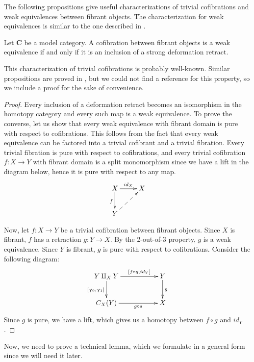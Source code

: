 \documentclass{tac}
\theoremstyle{definition}
\newcommand{\cat}[1]{\mathbf{#1}}
\newcommand{\C}{\cat{C}}
\newcommand{\cyli}{\upgamma}
\begin{document}
The following propositions give useful characterizations of trivial
cofibrations and weak equivalences between fibrant objects.
The characterization for weak equivalences is similar to the one described in \cite{vogt-we}.

\begin{prop}
Let $\C$ be a model category.
A cofibration between fibrant objects is a weak equivalence if and only if it is an inclusion of a strong deformation retract.
\end{prop}

This characterization of trivial cofibrations is probably well-known.
Similar propositions are proved in \cite{hirschhorn}, but we could not find a reference for this property, so we include a proof for the sake of convenience.

\begin{proof}
Every inclusion of a deformation retract becomes an isomorphism in the homotopy category and every such map is a weak equivalence.
To prove the converse, let us show that every weak equivalence with fibrant domain is pure with respect to cofibrations.
This follows from the fact that every weak equivalence can be factored into a trivial cofibrant and a trivial fibration.
Every trivial fibration is pure with respect to cofibrations, and every trivial cofibration $f : X \to Y$ with fibrant domain is a split monomorphism since we have a lift in the diagram below,
hence it is pure with respect to any map.
\[ \xymatrix{ X \ar[r]^{id_X} \ar[d]_f & X \\
              Y \ar@{-->}[ur]
            } \]

Now, let $f : X \to Y$ be a trivial cofibration between fibrant objects.
Since $X$ is fibrant, $f$ has a retraction $g : Y \to X$.
By the 2-out-of-3 property, $g$ is a weak equivalence.
Since $Y$ is fibrant, $g$ is pure with respect to cofibrations.
Consider the following diagram:
\[ \xymatrix{ Y \amalg_X Y \ar[rr]^-{[f \circ g, id_Y]} \ar[d]_{[\cyli_0,\cyli_1]} & & Y \ar[d]^g \\
              C_X(Y) \ar[rr]_-{g \circ s} & & X
            } \]
Since $g$ is pure, we have a lift, which gives us a homotopy between $f \circ g$ and $id_Y$.
\end{proof}

Now, we need to prove a technical lemma, which we formulate in a general form since we will need it later.
\end{document}
